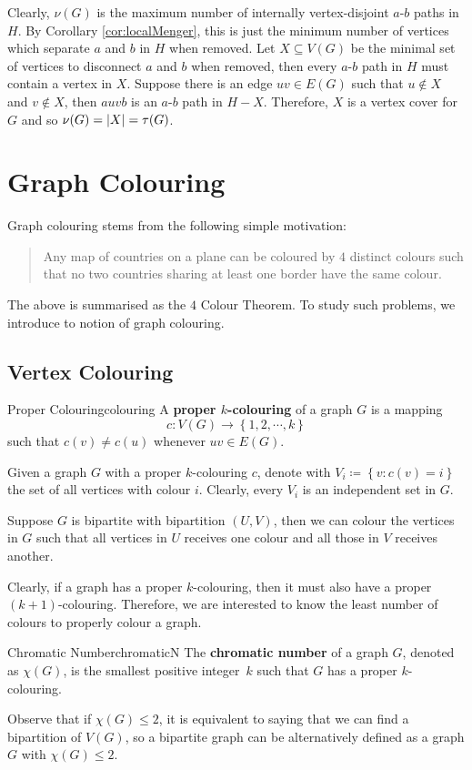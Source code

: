 \documentclass[math]{amznotes}
\theoremstyle{remark}
\newcommand{\0}{\mathbf{0}}
\newcommand{\1}{\mathbf{1}}
\begin{document}
Clearly, $\nu(G)$ is the maximum number of internally vertex-disjoint $a$-$b$ paths in $H$. By Corollary \ref{cor:localMenger}, this is just the minimum number of vertices which separate $a$ and $b$ in $H$ when removed. Let $X \subseteq V(G)$ be the minimal set of vertices to disconnect $a$ and $b$ when removed, then every $a$-$b$ path in $H$ must contain a vertex in $X$. Suppose there is an edge $uv \in E(G)$ such that $u \notin X$ and $v \notin X$, then $auvb$ is an $a$-$b$ path in $H - X$. Therefore, $X$ is a vertex cover for $G$ and so $\nu(G) = {\left\lvert {X} \right\rvert} = \tau(G)$.
\chapter{Graph Colouring}
Graph colouring stems from the following simple motivation:
\begin{quote}
    Any map of countries on a plane can be coloured by $4$ distinct colours such that no two countries sharing at least one border have the same colour.
\end{quote}
The above is summarised as the $4$ Colour Theorem. To study such problems, we introduce to notion of graph colouring.
\section{Vertex Colouring}
\begin{dfnbox}{Proper Colouring}{colouring}
    A {\color{red} \textbf{proper $k$-colouring}} of a graph $G$ is a mapping 
    \begin{equation*}
        c \colon V(G) \to \left\{1, 2, \cdots, k\right\}
    \end{equation*}
    such that $c(v) \neq c(u)$ whenever $uv \in E(G)$.
\end{dfnbox}
Given a graph $G$ with a proper $k$-colouring $c$, denote with $V_i \coloneqq \left\{v \colon c(v) = i\right\}$ the set of all vertices with colour $i$. Clearly, every $V_i$ is an independent set in $G$.

Suppose $G$ is bipartite with bipartition $(U, V)$, then we can colour the vertices in $G$ such that all vertices in $U$ receives one colour and all those in $V$ receives another.

Clearly, if a graph has a proper $k$-colouring, then it must also have a proper $(k + 1)$-colouring. Therefore, we are interested to know the least number of colours to properly colour a graph.
\begin{dfnbox}{Chromatic Number}{chromaticN}
    The {\color{red} \textbf{chromatic number}} of a graph $G$, denoted as $\chi(G)$, is the smallest positive integer~$k$ such that $G$ has a proper $k$-colouring.
\end{dfnbox}
Observe that if $\chi(G) \leq 2$, it is equivalent to saying that we can find a bipartition of $V(G)$, so a bipartite graph can be alternatively defined as a graph $G$ with $\chi(G) \leq 2$. 
\end{document}
